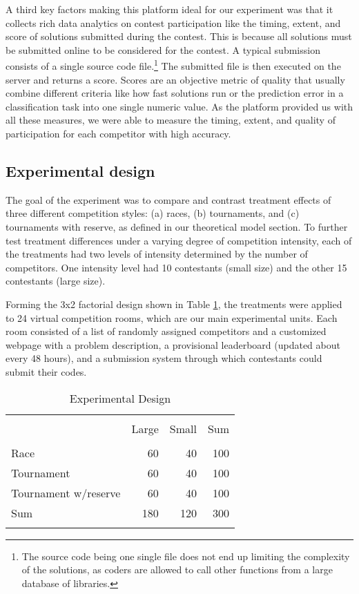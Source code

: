 \documentclass[11pt, titlepage]{article}
\begin{document}
A third key factors making this platform ideal for our experiment was
that it collects rich data analytics on contest participation like the
timing, extent, and score of solutions submitted during the contest.
This is because all solutions must be submitted online to be considered
for the contest. A typical submission consists of a single source code
file.\footnote{The source code being one single file does not end up
  limiting the complexity of the solutions, as coders are allowed to
  call other functions from a large database of libraries.} The
submitted file is then executed on the server and returns a score.
Scores are an objective metric of quality that usually combine different
criteria like how fast solutions run or the prediction error in a
classification task into one single numeric value. As the platform
provided us with all these measures, we were able to measure the timing,
extent, and quality of participation for each competitor with high
accuracy.

\subsection{Experimental design}\label{experimental-design}

The goal of the experiment was to compare and contrast treatment effects
of three different competition styles: (a) races, (b) tournaments, and
(c) tournaments with reserve, as defined in our theoretical model
section. To further test treatment differences under a varying degree of
competition intensity, each of the treatments had two levels of
intensity determined by the number of competitors. One intensity level
had 10 contestants (small size) and the other 15 contestants (large
size).

Forming the 3x2 factorial design shown in Table
\ref{experimental design}, the treatments were applied to 24 virtual
competition rooms, which are our main experimental units. Each room
consisted of a list of randomly assigned competitors and a customized
webpage with a problem description, a provisional leaderboard (updated
about every 48 hours), and a submission system through which contestants
could submit their codes.

\begin{table}
\centering
\caption{Experimental Design}
\label{experimental design}
\begin{tabular}{@{}lrrr}
  \\[-1.8ex]\hline\hline\\[-1.8ex]
 & Large & Small & Sum \\ 
  \hline\\[-1.86ex]
Race & 60 & 40 & 100 \\ 
  Tournament & 60 & 40 & 100 \\ 
  Tournament w/reserve & 60 & 40 & 100 \\ 
  Sum & 180 & 120 & 300 \\ 
   \hline\\[-1.8ex]
\end{tabular}
\end{table}
\end{document}

